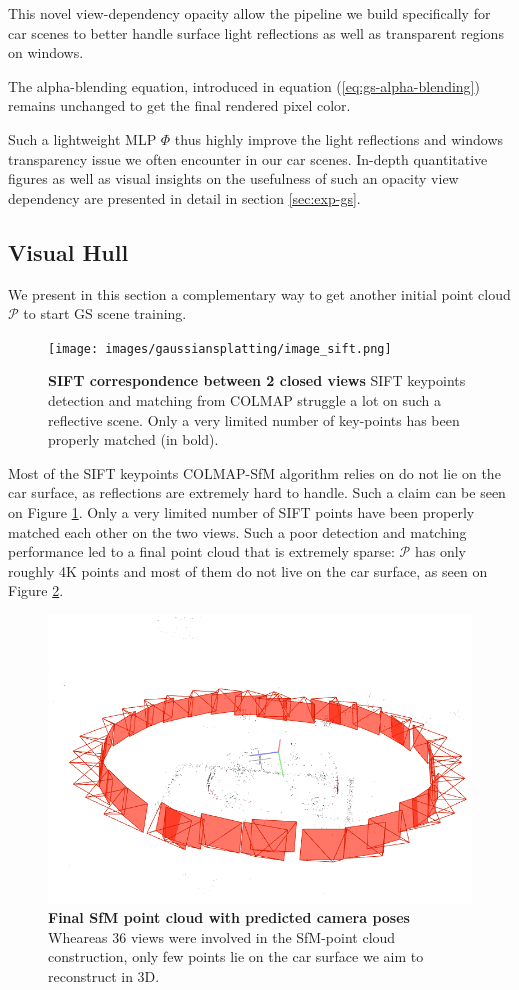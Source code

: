 This novel view-dependency opacity allow the pipeline we build specifically for car scenes to better handle surface light reflections as well as transparent regions on windows.

The alpha-blending equation, introduced in equation (\ref{eq:gs-alpha-blending}) remains unchanged to get the final rendered pixel color.

Such a lightweight MLP $\Phi$ thus highly improve the light reflections and windows transparency issue we often encounter in our car scenes. In-depth quantitative figures as well as visual insights on the usefulness of such an opacity view dependency are presented in detail in section \ref{sec:exp-gs}. 

\subsection{Visual Hull}

We present in this section a complementary way to get another initial point cloud $\mathcal{P}$ to start GS scene training. 


\begin{figure}[htbp!]
    \center
  \texttt{[image: images/gaussiansplatting/image\_sift.png]}
  \caption{\textbf{SIFT correspondence between 2 closed views} SIFT keypoints detection and matching from COLMAP struggle a lot on such a reflective scene. Only a very limited number of key-points has been properly matched (in bold).}
  \label{fig:sift-colmap}
\end{figure}

Most of the SIFT keypoints COLMAP-SfM algorithm relies on do not lie on the car surface, as reflections are extremely hard to handle. Such a claim can be seen on Figure \ref{fig:sift-colmap}. Only a very limited number of SIFT points have been properly matched each other on the two views. Such a poor detection and matching performance led to a 
final point cloud that is extremely sparse: $\mathcal{P}$ has only roughly 4K points and most of them do not live on the car surface, as seen on Figure \ref{fig:sfm-colmap-pc}. 

\begin{figure}[htbp!]
    \center
  \includegraphics[width=.8\linewidth]{images/gaussiansplatting/colmap_sparsePC.png}
  \caption{\textbf{Final SfM point cloud with predicted camera poses} Wheareas 36 views were involved in the SfM-point cloud construction, only few points lie on the car surface we aim to reconstruct in 3D.}
  \label{fig:sfm-colmap-pc}
\end{figure}


